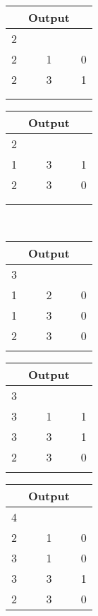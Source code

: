 \documentclass[11pt, a4paper, twoside]{article}
\begin{document}
\begin{ejemplo}
 \begin{center}
	\begin{minipage}{0.3\textwidth}
			\begin{tabular}{ccc}
				   & Output\\
				   \hline
				   2 &   &   \\
				   2 & 1 & 0 \\
				   2 & 3 & 1 \\
				   \\
				   \\
			\end{tabular}
	\end{minipage} 	
	\begin{minipage}{0.3\textwidth}
			\begin{tabular}{ccc}
				   & Output\\
				   \hline
				   2 &   &   \\
				   1 & 3 & 1 \\
				   2 & 3 & 0 \\
				   \\
				   \\
			\end{tabular}
	\end{minipage} 	\\
	\begin{minipage}{0.3\textwidth}
			\begin{tabular}{ccc}
				   & Output\\
				   \hline
				   3 &   &   \\
				   1 & 2 & 0 \\
				   1 & 3 & 0 \\
				   2 & 3 & 0 \\
				   \\
			\end{tabular}
	\end{minipage} 	
	\begin{minipage}{0.3\textwidth}
			\begin{tabular}{ccc}
				   & Output\\
				   \hline
				   3 &   &   \\
				   3 & 1 & 1 \\
				   3 & 3 & 1 \\
				   2 & 3 & 0 \\
				   \\
			\end{tabular}
	\end{minipage} 	
	\begin{minipage}{0.3\textwidth}
			\begin{tabular}{ccc}
				   & Output\\
				   \hline
				   4 &   &   \\
				   2 & 1 & 0 \\
				   3 & 1 & 0 \\
				   3 & 3 & 1 \\
				   2 & 3 & 0 \\
			\end{tabular}
	\end{minipage} 	
\end{center}	

\end{ejemplo}
 
\end{document}
